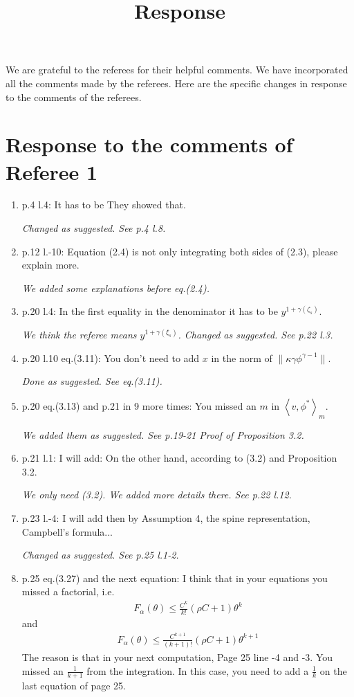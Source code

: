 \documentclass[12pt,a4paper]{amsart}
\numberwithin{equation}{section}
\theoremstyle{plain}
\theoremstyle{definition}
\begin{document}
\title
[Response]
{Response}
\maketitle
We are grateful to the referees for their helpful comments.
We have incorporated all the comments made by the referees.
Here are the specific changes in response to the comments of the referees.
\section*{Response to the comments of Referee 1}
\begin{enumerate}
\item
  p.4 l.4: It has to be They showed that.

  {\it Changed as suggested. See p.4 l.8.}
\item
  p.12 l.-10: Equation (2.4) is not only integrating both sides of (2.3), please explain more.

  {\it We added some explanations before eq.(2.4).}
\item
  p.20 l.4: In the first equality in the denominator it has to be $y^{1+\gamma(\zeta_s)}$.

  {\it We think the referee means $y^{1+\gamma(\xi_s)}$.
    Changed as suggested. 
    See p.22 l.3. }
\item
  p.20 l.10 eq.(3.11): You don't need to add $x$ in the norm of $\|\kappa \gamma \phi^{\gamma - 1}\|$.

  {\it Done as suggested. See eq.(3.11).}
\item
  p.20 eq.(3.13) and p.21 in 9 more times: You missed an $m$ in $\left\langle v, \phi^* \right\rangle_m$.

  {\it We added them as suggested. See p.19-21 Proof of Proposition 3.2.}
\item
  p.21 l.1: I will add: On the other hand, according to (3.2) and Proposition 3.2.

  {\it We only need (3.2). We added more details there. See p.22 l.12.}
\item
  p.23 l.-4: I will add then by Assumption 4, the spine representation, Campbell's formula...

  {\it Changed as suggested. See p.25 l.1-2.}
\item
  p.25 eq.(3.27) and the next equation: I think that in your equations you missed a factorial, i.e.
  \begin{align}
    F_\alpha(\theta)
    \leq \frac{C^k}{k!} \left( \rho C+1 \right) \theta^k
  \end{align}
  and
  \begin{align}
    F_\alpha(\theta)
    \leq \frac{C^{k+1}}{(k+1)!} \left( \rho  C+1 \right) \theta^{k+1}
  \end{align}
  The reason is that in your next computation, Page 25 line -4 and -3. You missed an $\frac{1}{k+1}$ from the integration.
  In this case, you need to add a $\frac{1}{k}$ on the last equation of page 25.


\end{enumerate}
\end{document}

